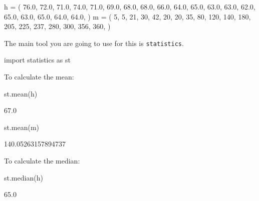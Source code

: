 \begin{pyin}
h = (
    76.0,
    72.0,
    71.0,
    74.0,
    71.0,
    69.0,
    68.0,
    68.0,
    66.0,
    64.0,
    65.0,
    63.0,
    63.0,
    62.0,
    65.0,
    63.0,
    65.0,
    64.0,
    64.0,
)
m = (
    5,
    5,
    21,
    30,
    42,
    20,
    20,
    35,
    80,
    120,
    140,
    180,
    205,
    225,
    237,
    280,
    300,
    356,
    360,
)
\end{pyin}





The main tool you are going to use for this is \texttt{statistics}.




\begin{pyin}
import statistics as st
\end{pyin}





To calculate the mean:




\begin{pyin}
st.mean(h)
\end{pyin}





\begin{raw}
67.0
\end{raw}







\begin{pyin}
st.mean(m)
\end{pyin}





\begin{raw}
140.05263157894737
\end{raw}





To calculate the median:




\begin{pyin}
st.median(h)
\end{pyin}





\begin{raw}
65.0
\end{raw}







